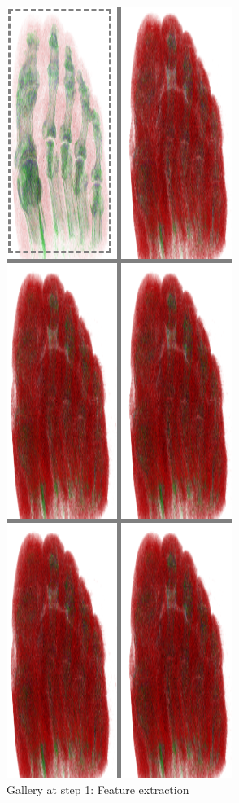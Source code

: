 \documentclass{egpubl-eurovis-short}
\begin{document}
\begin{figure}[htb]
  \includegraphics[width=.8\linewidth]{gallery.png}
   \caption{\label{fig:gallery}
     Gallery at step 1: Feature extraction}
\end{figure}
\end{document}
